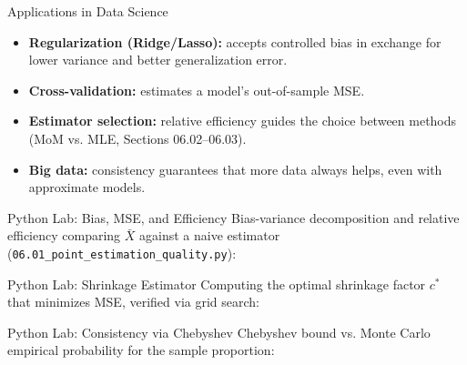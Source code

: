 \documentclass[aspectratio=169,xcolor={dvipsnames,table}]{beamer}
\begin{document}
\begin{frame}{Applications in Data Science}
	\vspace{-0.1cm}
	\begin{itemize}\itemsep=0.1cm
		\item \textbf{Regularization (Ridge/Lasso):} accepts controlled bias in exchange for lower variance and better generalization error. \pause
		\item \textbf{Cross-validation:} estimates a model's out-of-sample MSE. \pause
		\item \textbf{Estimator selection:} relative efficiency guides the choice between methods (MoM vs. MLE, Sections 06.02--06.03). \pause
		\item \textbf{Big data:} consistency guarantees that more data always helps, even with approximate models.
	\end{itemize}
\end{frame}

\begin{frame}[fragile]{Python Lab: Bias, MSE, and Efficiency}
	\vspace{-0.05cm}
	\scriptsize
	Bias-variance decomposition and relative efficiency comparing $\bar X$ against a naive estimator (\texttt{06.01\_point\_estimation\_quality.py}):
	{
	}
\end{frame}

\begin{frame}[fragile]{Python Lab: Shrinkage Estimator}
	\vspace{-0.05cm}
	\scriptsize
	Computing the optimal shrinkage factor $c^*$ that minimizes MSE, verified via grid search:
	{
	}
\end{frame}

\begin{frame}[fragile]{Python Lab: Consistency via Chebyshev}
	\vspace{-0.05cm}
	\scriptsize
	Chebyshev bound vs. Monte Carlo empirical probability for the sample proportion:
	{
	}
\end{frame}
\end{document}
